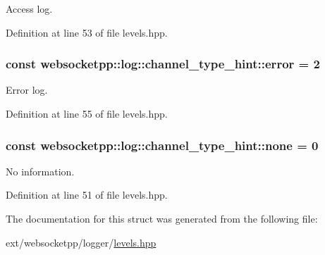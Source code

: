 Access log. 



Definition at line 53 of file levels.\+hpp.

\hypertarget{structwebsocketpp_1_1log_1_1channel__type__hint_a91473ac49fba696549da438483a6fe31}{}
\subsubsection[{error}]{ const websocketpp\+::log\+::channel\+\_\+type\+\_\+hint\+::error = 2\hspace{0.3cm}{\ttfamily [static]}}\label{structwebsocketpp_1_1log_1_1channel__type__hint_a91473ac49fba696549da438483a6fe31}


Error log. 



Definition at line 55 of file levels.\+hpp.

\hypertarget{structwebsocketpp_1_1log_1_1channel__type__hint_a2e7de3c97193085a20b7bb42815d23e2}{}
\subsubsection[{none}]{ const websocketpp\+::log\+::channel\+\_\+type\+\_\+hint\+::none = 0\hspace{0.3cm}{\ttfamily [static]}}\label{structwebsocketpp_1_1log_1_1channel__type__hint_a2e7de3c97193085a20b7bb42815d23e2}


No information. 



Definition at line 51 of file levels.\+hpp.



The documentation for this struct was generated from the following file\+:\begin{DoxyCompactItemize}
\item 
ext/websocketpp/logger/\hyperlink{levels_8hpp}{levels.\+hpp}\end{DoxyCompactItemize}
